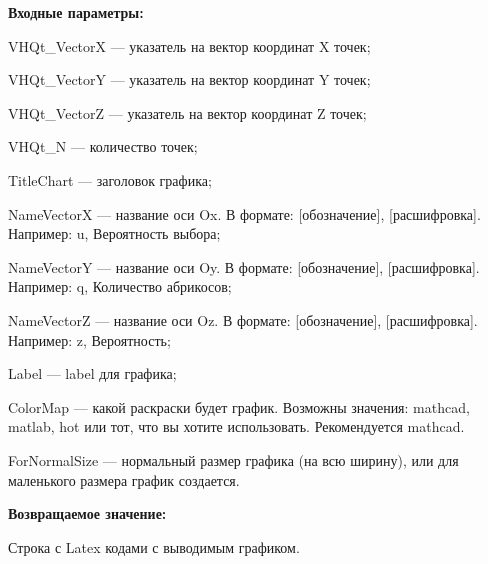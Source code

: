 \textbf{Входные параметры:}

VHQt\_VectorX --- указатель на вектор координат X точек;
 
VHQt\_VectorY --- указатель на вектор координат Y точек;
 
VHQt\_VectorZ --- указатель на вектор координат Z точек;
 
VHQt\_N --- количество точек;
 
TitleChart --- заголовок графика;
 
NameVectorX --- название оси Ox. В формате: [обозначение], [расшифровка]. Например: u, Вероятность выбора;
 
NameVectorY --- название оси Oy. В формате: [обозначение], [расшифровка]. Например: q, Количество абрикосов;
 
NameVectorZ --- название оси Oz. В формате: [обозначение], [расшифровка]. Например: z, Вероятность;
 
Label --- label для графика;
 
ColorMap --- какой раскраски будет график. Возможны значения: mathcad, matlab, hot или тот, что вы хотите использовать. Рекомендуется mathcad.
 
ForNormalSize --- нормальный размер графика (на всю ширину), или для маленького размера график создается.
	
\textbf{Возвращаемое значение:}

Строка с Latex кодами с выводимым графиком.